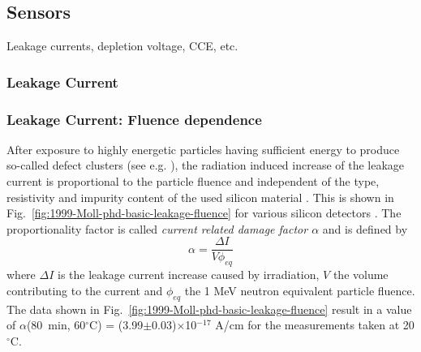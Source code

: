 
\subsection{Sensors}
\label{sec:sensors}

Leakage currents, depletion voltage, CCE, etc.

\subsubsection{Leakage Current}
\label{sec:leakagecurrent}
\subsubsection*{Leakage Current: Fluence dependence}
%
After exposure to highly energetic particles having sufficient energy to produce so-called defect clusters (see e.g. \cite{2018-Moll-DD}), the radiation induced increase of the leakage current is proportional to the particle fluence and independent of the type, resistivity and impurity content of the used silicon material \cite{1999-Moll-current, 2013-Srour-DD}. This is shown in Fig.~\ref{fig:1999-Moll-phd-basic-leakage-fluence} for various silicon detectors \cite{1999-Moll-phd}.
The proportionality factor is called {\em current related damage factor $\alpha$} and is defined by 
\begin{equation}
\alpha =\frac{\Delta I}{V \phi_{eq}}
\end{equation}
where $\Delta I$ is the leakage current increase caused by irradiation, $V$ the volume contributing to the current and $\phi_{eq}$ the 1 MeV neutron equivalent particle fluence. The data shown in Fig.~\ref{fig:1999-Moll-phd-basic-leakage-fluence} result in a value of $\alpha$(80~min, 60$^\circ$C) = (3.99$\pm$0.03)$\times$10$^{-17}$ A/cm for the measurements taken at 20$^\circ$C. 
